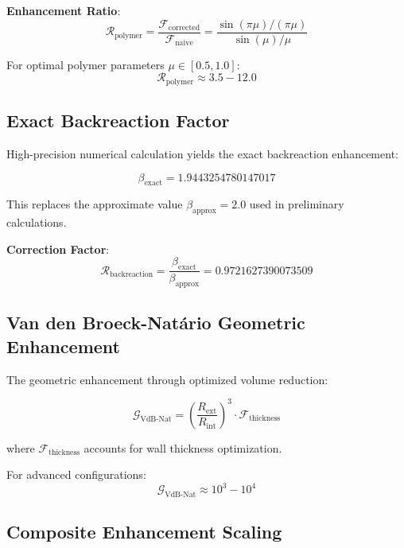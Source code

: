 \documentclass[12pt,a4paper]{article}
\begin{document}
\textbf{Enhancement Ratio}:
\begin{equation}
\mathcal{R}_{\text{polymer}} = \frac{\mathcal{F}_{\text{corrected}}}{\mathcal{F}_{\text{naive}}} = \frac{\sin(\pi\mu)/(\pi\mu)}{\sin(\mu)/\mu}
\end{equation}

For optimal polymer parameters $\mu \in [0.5, 1.0]$:
\begin{equation}
\mathcal{R}_{\text{polymer}} \approx 3.5 - 12.0
\end{equation}

\subsection{Exact Backreaction Factor}

High-precision numerical calculation yields the exact backreaction enhancement:

\begin{equation}
\beta_{\text{exact}} = 1.9443254780147017
\end{equation}

This replaces the approximate value $\beta_{\text{approx}} = 2.0$ used in preliminary calculations.

\textbf{Correction Factor}:
\begin{equation}
\mathcal{R}_{\text{backreaction}} = \frac{\beta_{\text{exact}}}{\beta_{\text{approx}}} = 0.9721627390073509
\end{equation}

\subsection{Van den Broeck-Natário Geometric Enhancement}

The geometric enhancement through optimized volume reduction:

\begin{equation}
\mathcal{G}_{\text{VdB-Nat}} = \left(\frac{R_{\text{ext}}}{R_{\text{int}}}\right)^3 \cdot \mathcal{F}_{\text{thickness}}
\end{equation}

where $\mathcal{F}_{\text{thickness}}$ accounts for wall thickness optimization.

For advanced configurations:
\begin{equation}
\mathcal{G}_{\text{VdB-Nat}} \approx 10^3 - 10^4
\end{equation}

\subsection{Composite Enhancement Scaling}
\end{document}
